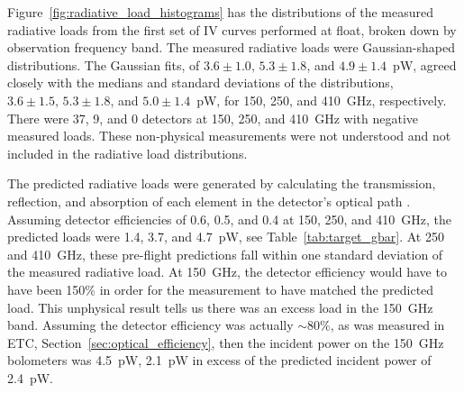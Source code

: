 




Figure~\ref{fig:radiative_load_histograms} has the distributions of the measured radiative loads from the first set of IV curves performed at float, broken down by observation frequency band. 
The measured radiative loads were Gaussian-shaped distributions. 
The Gaussian fits, of $3.6\pm 1.0, \, 5.3\pm 1.8$, and $4.9 \pm 1.4$~pW, agreed closely with the  medians and standard deviations of the distributions, $3.6\pm1.5, \, 5.3\pm1.8$, and $5.0\pm1.4$~pW, 
for 150, 250, and 410~GHz, respectively. 
There were 37, 9, and 0 detectors at 150, 250, and 410~GHz with negative measured loads. 
These non-physical measurements were not understood and not included in the radiative load distributions. 

The predicted radiative loads were generated by calculating the transmission, reflection, and absorption of each element in the detector's optical path \cite{EBEXPaper2}.  
Assuming detector efficiencies of 0.6, 0.5, and 0.4 at 150, 250, and 410~GHz, the predicted loads were 1.4, 3.7, and 4.7~pW, see Table~\ref{tab:target_gbar}.
At 250 and 410~GHz, these pre-flight predictions fall within one standard deviation of the measured radiative load. 
At 150~GHz, the detector efficiency would have to have been 150\% in order for the measurement to have matched the predicted load. 
This unphysical result tells us there was an excess load in the 150~GHz band. 
Assuming the detector efficiency was actually $\sim$80\%, as was measured in \ac{ETC}, Section~\ref{sec:optical_efficiency}, then the incident power on the 150~GHz bolometers was 4.5~pW, 2.1~pW in excess of the predicted incident power of 2.4~pW. 

